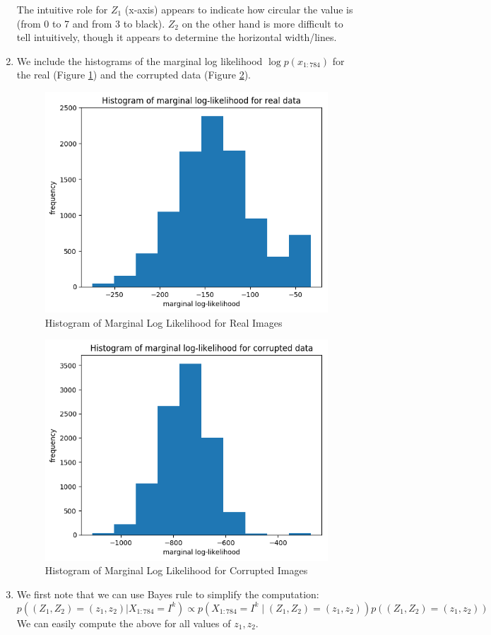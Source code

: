 \documentclass[12pt]{article}
\begin{document}
\begin{enumerate}
The intuitive role for $Z_1$ (x-axis) appears to indicate how circular the value is (from 0 to 7 and from 3 to black). $Z_2$ on the other hand is more difficult to tell intuitively, though it appears to determine the horizontal width/lines.

\item We include the histograms of the marginal log likelihood $\log p(x_{1:784})$ for the real (Figure \ref{fig:hist_real}) and the corrupted data (Figure \ref{fig:hist_corrupted}).
\begin{figure}[h!]
\centering
\includegraphics[scale=0.8]{programming/a6_hist_real.png}
\caption{Histogram of Marginal Log Likelihood for Real Images}
\label{fig:hist_real}
\end{figure}
\begin{figure}[h!]
\centering
\includegraphics[scale=0.8]{programming/a6_hist_corrupt.png}
\caption{Histogram of Marginal Log Likelihood for Corrupted Images}
\label{fig:hist_corrupted}
\end{figure}

\item We first note that we can use Bayes rule to simplify the computation:
$$
p((Z_1, Z_2) = (z_1, z_2)|X_{1:784} = I^k) \propto p(X_{1:784} = I^k \mid (Z_1, Z_2) = (z_1, z_2))p((Z_1, Z_2) = (z_1, z_2))
$$
We can easily compute the above for all values of $z_1, z_2$.

\end{enumerate}
\end{document}
